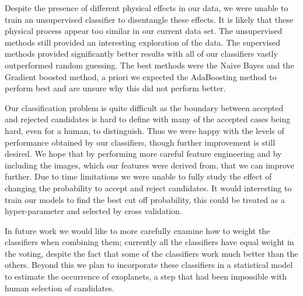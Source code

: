 Despite the presence of different physical effects in our data, we were unable to train an unsupervised classifier to disentangle these effects. It is likely that these physical process appear too similar in our current data set. The unsupervised methods still provided an interesting exploration of the data. The supervised methods provided significantly better results with all of our classifiers vastly outperformed random guessing. The best methods were the Naive Bayes and the Gradient boosted method, a priori we expected the AdaBoosting method to perform best and are unsure why this did not perform better.

Our classification problem is quite difficult as the boundary between accepted and rejected candidates is hard to define with many of the accepted cases being hard, even for a human, to distinguish. Thus we were happy with the levels of performance obtained by our classifiers, though further improvement is still desired. We hope that by performing more careful feature engineering and by including the images, which our features were derived from, that we can improve further. Due to time limitations we were unable to fully study the effect of changing the probability to accept and reject candidates. It would interesting to train our models to find the best cut off probability, this could be treated as a hyper-parameter and selected by cross validation.


In future work we would like to more carefully examine how to weight the classifiers when combining them; currently all the classifiers have equal weight in the voting, despite the fact that some of the classifiers work much better than the others. Beyond this we plan to incorporate these classifiers in a statistical model to estimate the occurrence of exoplanets, a step that had been impossible with human selection of candidates.